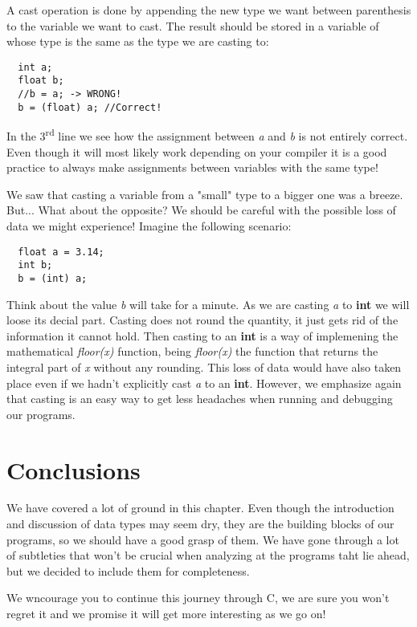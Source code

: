 \documentclass[12pt]{book}
\begin{document}
A cast operation is done by appending the new type we want between parenthesis to the variable we want to cast. The result should be stored in a variable of whose type is the same as the type we are casting to:

\begin{verbatim}
  int a;
  float b;
  //b = a; -> WRONG!
  b = (float) a; //Correct!
\end{verbatim}

In the 3\textsuperscript{rd} line we see how the assignment between \textit{a} and \textit{b} is not entirely correct. Even though it will most likely work depending on your compiler it is a good practice to always make assignments between variables with the same type!

We saw that casting a variable from a "small" type to a bigger one was a breeze. But... What about the opposite? We should be careful with the possible loss of data we might experience! Imagine the following scenario:

\begin{verbatim}
  float a = 3.14;
  int b;
  b = (int) a;
\end{verbatim}

Think about the value \textit{b} will take for a minute. As we are casting \textit{a} to \textbf{int} we will loose its decial part. Casting does not round the quantity, it just gets rid of the information it cannot hold. Then casting to an \textbf{int} is a way of implemening the mathematical \textit{floor(x)} function, being \textit{floor(x)} the function that returns the integral part of \textit{x} without any rounding. This loss of data would have also taken place even if we hadn't explicitly cast \textit{a} to an \textbf{int}. However, we emphasize again that casting is an easy way to get less headaches when running and debugging our programs.

\section{Conclusions}

We have covered a lot of ground in this chapter. Even though the introduction and discussion of data types may seem dry, they are the building blocks of our programs, so we should have a good grasp of them. We have gone through a lot of subtleties that won't be crucial when analyzing at the programs taht lie ahead, but we decided to include them for completeness.

We wncourage you to continue this journey through C, we are sure you won't regret it and we promise it will get more interesting as we go on!
\end{document}
